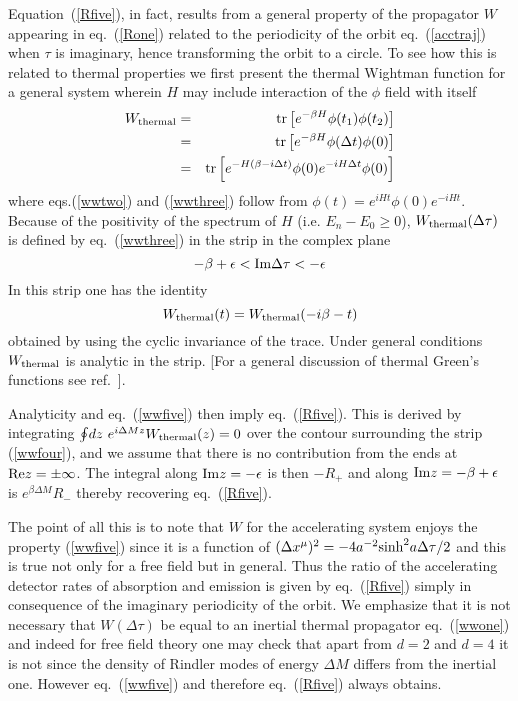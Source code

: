 \documentclass[12pt,oneside]{report}
\begin{document}
Equation~(\ref{Rfive}), in fact, results from a general property of the
propagator $W$ appearing in eq.~(\ref{Rone}) related to the periodicity of the
orbit eq.~(\ref{acctraj}) when  $\tau$ is imaginary, hence transforming the
orbit to a circle. To see how this is related to thermal properties we first
present the thermal Wightman function for a general system 
wherein $H$ may include interaction of the $\phi$ field with itself
\begin{eqnarray}
W_{\rm thermal} &=& {\rm tr}\left [ e^{-\beta H} \phi(t_1) \phi(t_2) \right ]
\label{wwone}\\
&=& {\rm tr} \left [ e^{-\beta H} \phi(\Delta t) \phi(0)\right ]
\label{wwtwo}\\
&=& {\rm tr}\left [ e^{-H (\beta - i \Delta t) } \phi(0) 
e^{-i H \Delta t }\phi(0) \right ] \label{wwthree}
\end{eqnarray}
where eqs.(\ref{wwtwo}) and (\ref{wwthree}) follow from $\phi(t) = e^{i H t}
\phi(0) e^{-i H t}$. Because of the positivity of the
spectrum of $H$ (i.e. $E_n - E_0 \geq 0$), $W_{\rm thermal}(\Delta \tau)$ is
defined  by eq.~(\ref{wwthree}) in the strip in the complex plane
\begin{equation}
-\beta +\epsilon < {\rm Im} \Delta \tau <  - \epsilon \label{wwfour}
\end{equation}
In this strip one has the identity
\begin{equation}
W_{\rm thermal}(t) = W_{\rm thermal} (-i \beta -t)
\label{wwfive}
\end{equation}
obtained by using the cyclic invariance of the trace. Under general
conditions $W_{\rm thermal}$ is analytic in the strip. [For a general
discussion of thermal Green's functions see ref.~\cite{FuRu}].

Analyticity and eq.~(\ref{wwfive}) then imply eq.~(\ref{Rfive}). This is derived
by integrating $\oint \! dz\ e^{i \Delta M z} W_{\rm thermal}(z) =0$ over the
contour surrounding the strip (\ref{wwfour}), and we assume that there is no
contribution from the ends at ${\rm Re} z = \pm \infty$. The integral along ${\rm Im}
z= -\epsilon$ is then $- R_+$ and along ${\rm Im}
z= -\beta +\epsilon$
 is $e^{\beta \Delta M } R_-$ thereby recovering eq.~(\ref{Rfive}).

The point of all this is to note that $W$ for the accelerating system enjoys
the property (\ref{wwfive}) since it is a function of $( \Delta x^{\mu})^2 
= - 4 a^{-2}
{\rm sinh}^2 a \Delta \tau /2$ and this is true not only for a free field but
in general. Thus  the ratio of the accelerating detector rates of
absorption and emission is given by eq.~(\ref{Rfive}) simply in consequence
of the imaginary periodicity of the orbit. We emphasize that it 
is not necessary that
$W(\Delta \tau)$ be equal to an inertial thermal propagator eq.~(\ref{wwone})
and indeed for free field theory one may check that apart from $d=2$ and
$d=4$ it is not since the density of Rindler modes of energy $ \Delta M$
differs from the inertial one. 
However eq.~(\ref{wwfive}) and therefore eq.~(\ref{Rfive})
always obtains.
\end{document}
